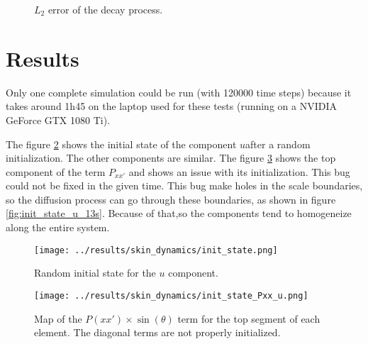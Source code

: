 \documentclass[a4paper]{article}
\begin{document}
\begin{figure}
\label{fig:err2-decay}
\caption{$L_2$ error of the decay process.}
\end{figure}

\section{Results}
\label{sec:results}

Only one complete simulation could be run (with 120000 time steps) because it takes around 1h45 on the laptop used for these tests (running on a NVIDIA GeForce GTX 1080 Ti).

The figure \ref{fig:init_state_u} shows the initial state of the component $u$after a random initialization. The other components are similar. The figure \ref{fig:init_state_Pxx_u} shows the top component of the term $P_{xx'}$ and shows an issue with its initialization. This bug could not be fixed in the given time. This bug make holes in the scale boundaries, so the diffusion process can go through these boundaries, as shown in figure \ref{fig:init_state_u_13s}. Because of that,so the components tend to homogeneize along the entire system.

\begin{figure}
\label{fig:init_state_u}
	\texttt{[image: ../results/skin\_dynamics/init\_state.png]}
	\caption{Random initial state for the $u$ component.}
\end{figure}

\begin{figure}
\label{fig:init_state_Pxx_u}
	\texttt{[image: ../results/skin\_dynamics/init\_state\_Pxx\_u.png]}
	\caption{Map of the $P(xx') \times \sin(\theta)$ term for the top segment of each element. The diagonal terms are not properly initialized.}
\end{figure}
\end{document}

